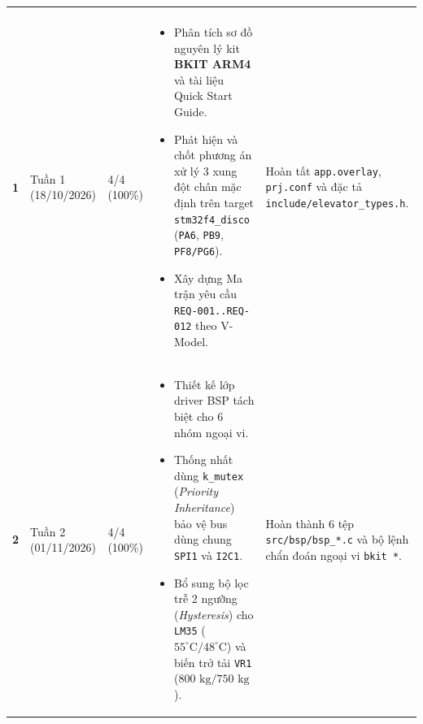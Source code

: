 \begingroup
\renewcommand{\arraystretch}{1.24}%
\setlength{\tabcolsep}{5pt}%
\fontsize{8.6}{11.0}\selectfont
{}%
\begin{xltabular}{\textwidth}{|C{0.9cm}|C{2.1cm}|C{1.6cm}|Y|L{3.5cm}|}
\hline
{}
 &  &  &  &  \\
\hline
\endfirsthead
\hline
{}
 &  &  &  &  \\
\hline
\endhead
\hline
\endfoot
\hline
\endlastfoot
\textbf{1} & Tuần 1 \newline (18/10/2026) & 4/4 \newline (100\%) &
\begin{itemize}[nosep, leftmargin=1.1em, topsep=1pt, partopsep=0pt]
    \item Phân tích sơ đồ nguyên lý kit \textbf{BKIT ARM4} và tài liệu Quick Start Guide.
    \item Phát hiện và chốt phương án xử lý 3 xung đột chân mặc định trên target \texttt{stm32f4\_disco} (\texttt{PA6}, \texttt{PB9}, \texttt{PF8/PG6}).
    \item Xây dựng Ma trận yêu cầu \texttt{REQ-001..REQ-012} theo V-Model.
\end{itemize} & Hoàn tất \texttt{app.overlay}, \texttt{prj.conf} và đặc tả \texttt{include/elevator\_\allowbreak types.h}. \\
\hline
{}
\textbf{2} & Tuần 2 \newline (01/11/2026) & 4/4 \newline (100\%) &
\begin{itemize}[nosep, leftmargin=1.1em, topsep=1pt, partopsep=0pt]
    \item Thiết kế lớp driver BSP tách biệt cho 6 nhóm ngoại vi.
    \item Thống nhất dùng \texttt{k\_mutex} (\textit{Priority Inheritance}) bảo vệ bus dùng chung \texttt{SPI1} và \texttt{I2C1}.
    \item Bổ sung bộ lọc trễ 2 ngưỡng (\textit{Hysteresis}) cho \texttt{LM35} ($55^\circ\text{C}/48^\circ\text{C}$) và biến trở tải \texttt{VR1} ($800\text{ kg}/750\text{ kg}$).
\end{itemize} & Hoàn thành 6 tệp \texttt{src/bsp/bsp\_*.c} và bộ lệnh chẩn đoán ngoại vi \texttt{bkit *}. \\
\hline

\end{xltabular}
